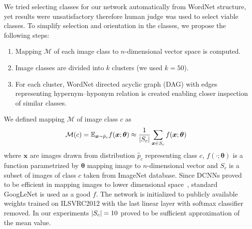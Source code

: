 We tried selecting classes for our network automatically from WordNet structure, yet results were unsatisfactory therefore human judge was used to select viable classes. To simplify selection and orientation in the classes, we propose the following steps:
\begin{enumerate}
	\item Mapping $\mathcal{M}$ of each image class to $n$-dimensional vector space is computed.
	\item Image classes are divided into $k$ clusters (we used $k=50$).
	\item For each cluster, WordNet directed acyclic graph (DAG) with edges representing hypernym--hyponym relation is created enabling closer inspection of similar classes.
\end{enumerate}
We defined mapping $\mathcal{M}$ of image class $c$ as
\begin{equation}
\mathcal{M}(c)=\mathbb{E}_{\bm{x}\sim \hat{p}_{c}}f(\bm{x};\bm{\theta})\approx\frac{1}{\left|{S_c}\right|}\sum_{\bm{x}\in S_c}f(\bm{x};\bm{\theta})
\end{equation}
where $\bm{x}$ are images drawn from distribution $\hat{p}_{c}$ representing class $c$, $f(\cdot;\bm{\theta})$ is a function parametrized by $\bm{\theta}$ mapping image to $n$-dimensional vector and $S_c$ is a subset of images of class $c$ taken from ImageNet database. Since DCNNs proved to be efficient in mapping images to lower dimensional space~\cite{donahue2014decaf}, standard GoogLeNet is used as a good $f$. The network is initialized to publicly available weights \cite{TFmodels} trained on ILSVRC2012 with the last linear layer with softmax classifier removed. In our experiments $\left|{S_c}\right|=10$ proved to be sufficient approximation of the mean value.

